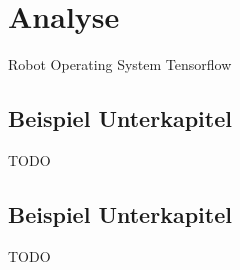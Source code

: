 \chapter{Analyse}
Robot Operating System \cite{288}
\newline
Tensorflow \cite{Abadi:2016:TSL:3026877.3026899}

\section{Beispiel Unterkapitel}
TODO

\section{Beispiel Unterkapitel}
TODO